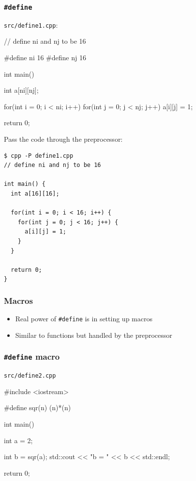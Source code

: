 \documentclass[12pt,letterpaper,twoside]{article}
\begin{document}
\subsubsection{\texorpdfstring{\texttt{\#define}}{\#define}}
\texttt{src/define1.cpp}:

\begin{cpp}
// define ni and nj to be 16

#define ni 16
#define nj 16

int main() {
  int a[ni][nj];

  for(int i = 0; i < ni; i++) {
    for(int j = 0; j < nj; j++) {
      a[i][j] = 1;
    }
  }

  return 0;
}
\end{cpp}

Pass the code through the preprocessor:

\begin{verbatim}
$ cpp -P define1.cpp
// define ni and nj to be 16

int main() {
  int a[16][16];

  for(int i = 0; i < 16; i++) {
    for(int j = 0; j < 16; j++) {
      a[i][j] = 1;
    }
  }

  return 0;
}
\end{verbatim}

\subsubsection{Macros}
\begin{itemize}
\item
  Real power of \texttt{\#define} is in setting up macros
\item
  Similar to functions but handled by the preprocessor
\end{itemize}

\subsubsection{\texorpdfstring{\texttt{\#define} macro}{\#define macro}}
\texttt{src/define2.cpp}

\begin{cpp}
#include <iostream>

#define sqr(n) (n)*(n)

int main() {
  int a = 2;

  int b = sqr(a);
  std::cout << "b = " << b << std::endl;

  return 0;
}
\end{cpp}
\end{document}
